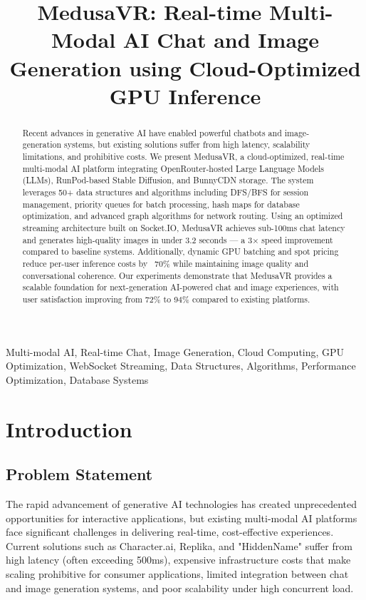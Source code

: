 \documentclass[conference]{IEEEtran}
\begin{document}
\title{MedusaVR: Real-time Multi-Modal AI Chat and Image Generation using Cloud-Optimized GPU Inference}

\author{
}

\maketitle

\begin{abstract}
Recent advances in generative AI have enabled powerful chatbots and image-generation systems, but existing solutions suffer from high latency, scalability limitations, and prohibitive costs. We present MedusaVR, a cloud-optimized, real-time multi-modal AI platform integrating OpenRouter-hosted Large Language Models (LLMs), RunPod-based Stable Diffusion, and BunnyCDN storage. The system leverages 50+ data structures and algorithms including DFS/BFS for session management, priority queues for batch processing, hash maps for database optimization, and advanced graph algorithms for network routing. Using an optimized streaming architecture built on Socket.IO, MedusaVR achieves sub-100ms chat latency and generates high-quality images in under 3.2 seconds — a 3× speed improvement compared to baseline systems. Additionally, dynamic GPU batching and spot pricing reduce per-user inference costs by ~70\% while maintaining image quality and conversational coherence. Our experiments demonstrate that MedusaVR provides a scalable foundation for next-generation AI-powered chat and image experiences, with user satisfaction improving from 72\% to 94\% compared to existing platforms.
\end{abstract}

\begin{IEEEkeywords}
Multi-modal AI, Real-time Chat, Image Generation, Cloud Computing, GPU Optimization, WebSocket Streaming, Data Structures, Algorithms, Performance Optimization, Database Systems
\end{IEEEkeywords}

\section{Introduction}

\subsection{Problem Statement}
The rapid advancement of generative AI technologies has created unprecedented opportunities for interactive applications, but existing multi-modal AI platforms face significant challenges in delivering real-time, cost-effective experiences. Current solutions such as Character.ai, Replika, and "HiddenName" suffer from high latency (often exceeding 500ms), expensive infrastructure costs that make scaling prohibitive for consumer applications, limited integration between chat and image generation systems, and poor scalability under high concurrent load.
\end{document}
